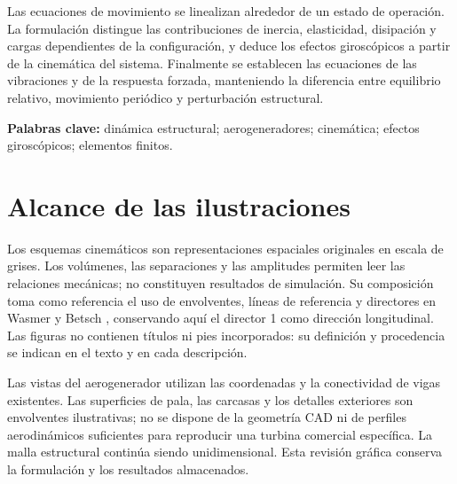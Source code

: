 \documentclass[11pt,a4paper,oneside]{report}
\begin{document}
Las ecuaciones de movimiento se linealizan alrededor de un estado de operación. La formulación distingue las contribuciones de inercia, elasticidad, disipación y cargas dependientes de la configuración, y deduce los efectos giroscópicos a partir de la cinemática del sistema. Finalmente se establecen las ecuaciones de las vibraciones y de la respuesta forzada, manteniendo la diferencia entre equilibrio relativo, movimiento periódico y perturbación estructural.

\noindent\textbf{Palabras clave:} dinámica estructural; aerogeneradores; cinemática; efectos giroscópicos; elementos finitos.

\chapter*{Alcance de las ilustraciones}
Los esquemas cinemáticos son representaciones espaciales originales en escala de grises. Los volúmenes, las separaciones y las amplitudes permiten leer las relaciones mecánicas; no constituyen resultados de simulación. Su composición toma como referencia el uso de envolventes, líneas de referencia y directores en Wasmer y Betsch \cite{wasmer2024}, conservando aquí el director 1 como dirección longitudinal. Las figuras no contienen títulos ni pies incorporados: su definición y procedencia se indican en el texto y en cada descripción.

Las vistas del aerogenerador utilizan las coordenadas y la conectividad de vigas existentes. Las superficies de pala, las carcasas y los detalles exteriores son envolventes ilustrativas; no se dispone de la geometría CAD ni de perfiles aerodinámicos suficientes para reproducir una turbina comercial específica. La malla estructural continúa siendo unidimensional. Esta revisión gráfica conserva la formulación y los resultados almacenados.
\end{document}
